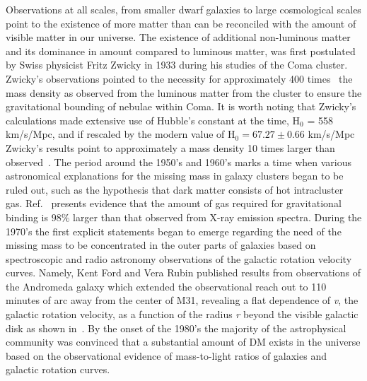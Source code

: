 Observations at all scales, from smaller dwarf galaxies to large cosmological scales point to the existence of more matter than can be reconciled with the amount of visible matter in our universe. The existence of additional non-luminous matter and its dominance in amount compared to luminous matter, was first postulated by Swiss physicist Fritz Zwicky in 1933 during his studies of the Coma cluster. Zwicky's observations pointed to the necessity for approximately 400 times~\cite{2009GReGr} the mass density as observed from the luminous matter from the cluster to ensure the gravitational bounding of nebulae within Coma. It is worth noting that Zwicky's calculations made extensive use of Hubble's constant at the time, H$_0$ = 558 km/s/Mpc, and if rescaled by the modern value of H$_0 = 67.27 \pm 0.66$ km/s/Mpc~\cite{Ade:2015xua} Zwicky's results point to approximately a mass density 10 times larger than observed~\cite{Bertone:2016nfn}. The period around the 1950's and 1960's marks a time when various astronomical explanations for the missing mass in galaxy clusters began to be ruled out, such as the hypothesis that dark matter consists of hot intracluster gas. Ref.~\cite{MEEKINS1971} presents evidence that the amount of gas required for gravitational binding is $98\%$ larger than that observed from X-ray emission spectra. During the 1970's the first explicit statements began to emerge regarding the need of the missing mass to be concentrated in the outer parts of galaxies based on spectroscopic and radio astronomy observations of the galactic rotation velocity curves. Namely, Kent Ford and Vera Rubin published results from observations of the Andromeda galaxy which extended the observational reach out to 110 minutes of arc away from the center of M31, revealing a flat dependence of \textit{v}, the galactic rotation velocity, as a function of the radius \textit{r} beyond the visible galactic disk as shown in~. By the onset of the 1980's the majority of the astrophysical community was convinced that a substantial amount of DM exists in the universe based on the observational evidence of mass-to-light ratios of galaxies and galactic rotation curves.

